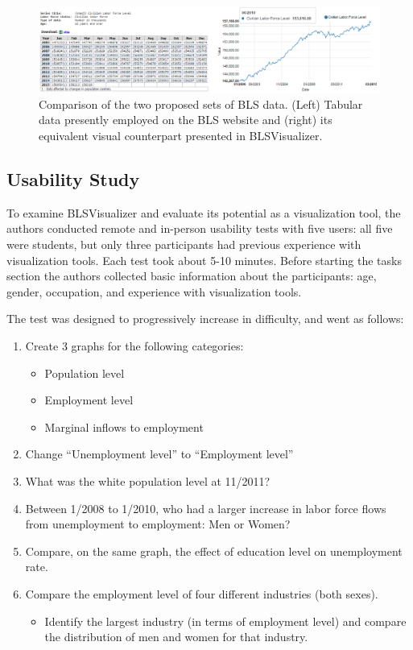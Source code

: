 \documentclass{sigchi}
\begin{document}
\begin{figure}[t]
\centering
    \includegraphics[width = 6.2in]{figures/PlotTable.png}
    \caption{Comparison of the two proposed sets of BLS data. (Left) Tabular data presently employed on the BLS website and (right) its equivalent visual counterpart presented in BLSVisualizer.}
    \label{TablePlot}
\end{figure}


\subsection{Usability Study}

To examine BLSVisualizer and evaluate its potential as a visualization tool, the authors conducted remote and in-person usability tests with five users: all five were students, but only three participants had previous experience with visualization tools. Each test took about 5-10 minutes. Before starting the tasks section the authors collected basic information about the participants: age, gender, occupation, and experience with visualization tools.

The test was designed to progressively increase in difficulty, and went as follows:

\begin{enumerate}
  \item Create 3 graphs for the following categories:

\begin{itemize}
  \item Population level
  \item Employment level
  \item Marginal inflows to employment
\end{itemize}

  \item Change ``Unemployment level'' to ``Employment level''
  \item What was the white population level at 11/2011?
  \item Between 1/2008 to 1/2010, who had a larger increase in labor force flows from unemployment to employment: Men or Women?
  \item Compare, on the same graph, the effect of education level on unemployment rate.
  \item Compare the employment level of four different industries (both sexes).
\begin{itemize}
  \item Identify the largest industry (in terms of employment level) and compare the distribution of men and women for that industry.
\end{itemize}

\end{enumerate}
\end{document}

